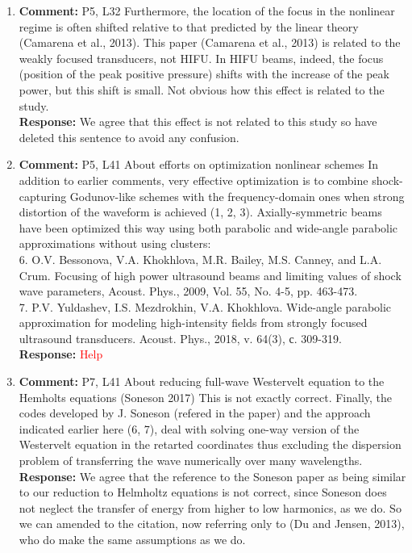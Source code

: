 \documentclass[11pt]{article}
\begin{document}
\begin{enumerate}
	\item \textbf{Comment:} P5, L32 Furthermore, the location of the focus in the nonlinear regime is often shifted relative to that predicted by the linear theory (Camarena et al., 2013).
	This paper (Camarena et al., 2013) is related to the weakly focused transducers, not HIFU. In HIFU beams, indeed, the focus (position of the peak positive pressure) shifts with the increase of the peak power, but this shift is small. Not obvious how this effect is related to the study. \\
	\textbf{Response:} We agree that this effect is not related to this study so have deleted this sentence to avoid any confusion.

	\item \textbf{Comment:} P5, L41 About efforts on optimization nonlinear schemes
	In addition to earlier comments, very effective optimization is to combine shock-capturing Godunov-like schemes with the frequency-domain ones when strong distortion of the waveform is achieved (1, 2, 3). Axially-symmetric beams have been optimized this way using both parabolic and wide-angle parabolic approximations without using clusters:\\
	6. O.V. Bessonova, V.A. Khokhlova, M.R. Bailey, M.S. Canney, and L.A. Crum. Focusing of high power ultrasound beams and limiting values of shock wave parameters, Acoust. Phys., 2009, Vol. 55, No. 4-5, pp. 463-473.\\
	7. P.V. Yuldashev, I.S. Mezdrokhin, V.A. Khokhlova. Wide-angle parabolic approximation for modeling high-intensity fields from strongly focused ultrasound transducers. Acoust. Phys., 2018, v. 64(3), с. 309-319.\\
	\textbf{Response:} \textcolor{red}{Help}

	\item \textbf{Comment:} P7, L41 About reducing full-wave Westervelt equation to the Hemholts equations (Soneson 2017)
	This is not exactly correct. Finally, the codes developed by J. Soneson (refered in the paper) and the approach indicated earlier here (6, 7), deal with solving one-way version of the Westervelt equation in the retarted coordinates thus excluding the dispersion problem of transferring the wave numerically over many wavelengths. \\
	\textbf{Response:} We agree that the reference to the Soneson paper as being similar 
	to our reduction to Helmholtz equations is not correct, since Soneson does not neglect the transfer of 
	energy from higher to low harmonics, as we do. So we can amended to the citation, now referring only to (Du and Jensen, 2013), who do make the same assumptions as we do.


\end{enumerate}
\end{document}
